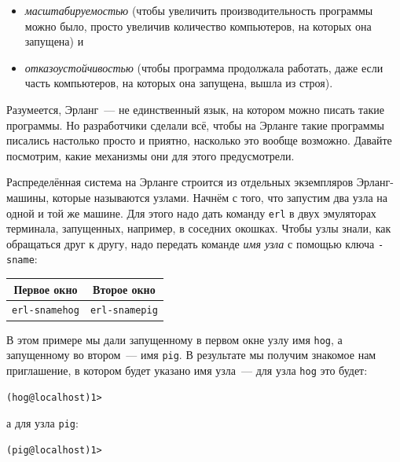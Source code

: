 \documentclass[
  paper=a4,
  fontsize=14pt,
  openany,
  appendixprefix=true
]{scrbook}
\begin{document}
\begin{itemize}
\item {\em масштабируемостью} (чтобы увеличить производительность программы можно было, просто увеличив количество компьютеров, на которых она запущена) и
\item {\em отказоустойчивостью} (чтобы программа продолжала работать, даже если часть компьютеров, на которых она запущена, вышла из строя).
\end{itemize}

Разумеется, Эрланг~--- не единственный язык, на котором можно писать такие программы. Но разработчики сделали всё, чтобы на Эрланге такие программы писались настолько просто и приятно, насколько это вообще возможно. Давайте посмотрим, какие механизмы они для этого предусмотрели.

Распределённая система на Эрланге строится из отдельных экземпляров Эрланг-машины, которые называются узлами. Начнём с того, что запустим два узла на одной и той же машине. Для этого надо дать команду \lstinline{erl} в двух эмуляторах терминала, запущенных, например, в соседних окошках. Чтобы узлы знали, как обращаться друг к другу, надо передать команде {\em имя узла} с помощью ключа \lstinline{-sname}:

\begin{center}
\begin{tabular}{|c|c|}

\hline
Первое окно  & Второе окно \\

\hline
\begin{minipage}[t]{0.35\textwidth}
  \begin{alltt}
    erl -sname hog
  \end{alltt}
\end{minipage}
& 
\begin{minipage}[t]{0.35\textwidth}
  \begin{alltt}
    erl -sname pig
  \end{alltt}
\end{minipage}
\\

\hline
\end{tabular}
\end{center}

В этом примере мы дали запущенному в первом окне узлу имя \lstinline{hog}, а запущенному во втором~--- имя \lstinline{pig}. В результате мы получим знакомое нам приглашение, в котором будет указано имя узла~--- для узла \lstinline{hog} это будет:
\begin{verbatim}
(hog@localhost)1>
\end{verbatim}
а для узла \lstinline{pig}:
\begin{verbatim}
(pig@localhost)1>
\end{verbatim}
\end{document}
